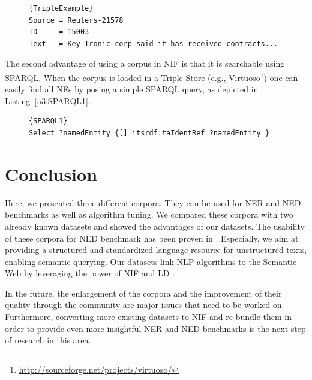 \begin{figure}[htb!]
\begin{lstlisting}[label=n3:TripleExample,caption=Example input text.]{TripleExample}
Source = Reuters-21578
ID     = 15003
Text   = Key Tronic corp said it has received contracts...
\end{lstlisting}
\end{figure}




The second advantage of using a corpus in NIF is that it is searchable using SPARQL.
When the corpus is loaded in a Triple Store (e.g., Virtuoso\footnote{\url{http://sourceforge.net/projects/virtuoso/}}) one can easily find all NEs by posing a simple SPARQL query, as depicted in Listing~\ref{n3:SPARQL1}.
\begin{figure}[htb!]
\begin{lstlisting}[label=n3:SPARQL1,caption=SPARQL query to get all NEs.]{SPARQL1}
Select ?namedEntity {[] itsrdf:taIdentRef ?namedEntity }
\end{lstlisting}
\end{figure}
\section{Conclusion}

Here, we presented three different corpora.
They can be used for \ac{NER}  and \ac{NED}  benchmarks as well as algorithm tuning.
We compared these corpora with two already known datasets and showed the advantages of our datasets.
The usability of these corpora for \ac{NED}  benchmark has been proven in \cite{agdistis_iswc,GER+13}.
Especially, we aim at providing a structured and standardized language resource for unstructured texts, enabling semantic querying.
Our datasets link \ac{NLP}  algorithms to the Semantic Web by leveraging the power of NIF and \ac{LD} .

In the future, the enlargement of the corpora and the improvement of their quality through the community are major issues that need to be worked on. 
Furthermore, converting more existing datasets to NIF and re-bundle them in order to provide even more insightful NER and NED benchmarks is the next step of research in this area.

